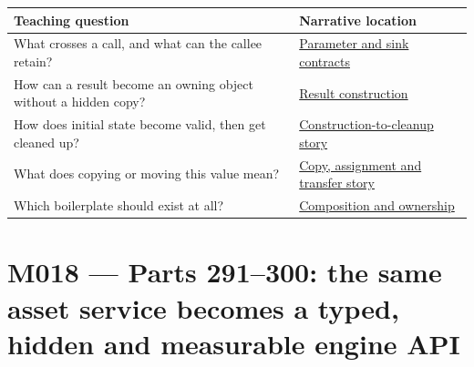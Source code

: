 {\def\LTcaptype{none} %
\begin{longtable}[]{@{}
  >{\raggedright\arraybackslash}p{}
  >{\raggedright\arraybackslash}p{}@{}}
\toprule\noalign{}
\begin{minipage}[b]{\linewidth}\raggedright
Teaching question
\end{minipage} & \begin{minipage}[b]{\linewidth}\raggedright
Narrative location
\end{minipage} \\
\midrule\noalign{}
\endhead
\bottomrule\noalign{}
\endlastfoot
What crosses a call, and what can the callee retain? & \href{Continuous\%20Notes/Computing\%20Foundations\%20-\%20From\%20Bits\%20to\%20C++\%20and\%20Systems\%20APIs\#A\%20value\%20crosses\%20the\%20function\%20boundary/}{Parameter and sink contracts} \\
How can a result become an owning object without a hidden copy? & \href{Continuous\%20Notes/Computing\%20Foundations\%20-\%20From\%20Bits\%20to\%20C++\%20and\%20Systems\%20APIs\#Return\%20a\%20result\%20without\%20handing\%20out\%20a\%20lifetime\%20problem/}{Result construction} \\
How does initial state become valid, then get cleaned up? & \href{Continuous\%20Notes/Computing\%20Foundations\%20-\%20From\%20Bits\%20to\%20C++\%20and\%20Systems\%20APIs\#Construction\%20establishes\%20a\%20usable\%20state/}{Construction-to-cleanup story} \\
What does copying or moving this value mean? & \href{Continuous\%20Notes/Computing\%20Foundations\%20-\%20From\%20Bits\%20to\%20C++\%20and\%20Systems\%20APIs\#Copy\%20a\%20meaning\%20rather\%20than\%20just\%20its\%20bytes/}{Copy, assignment and transfer story} \\
Which boilerplate should exist at all? & \href{Continuous\%20Notes/Computing\%20Foundations\%20-\%20From\%20Bits\%20to\%20C++\%20and\%20Systems\%20APIs\#From\%20three\%20repairs\%20to\%20five\%20decisions\%20to\%20zero\%20boilerplate/}{Composition and ownership} \\
\end{longtable}
}

\section{M018 --- Parts 291--300: the same asset service becomes a typed, hidden and measurable engine API}\label{appendix-fd090d982a15-m018-parts-291300-the-same-asset-service-becomes-a-typed-hidden-and-measurable-engine-api}

